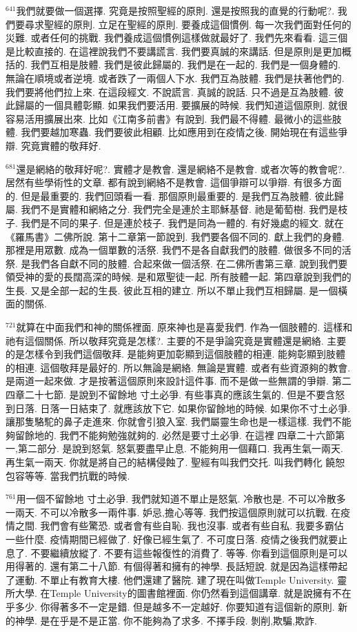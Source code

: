 \documentclass{book}
\begin{document}
$^{641}$我們就要做一個選擇.
究竟是按照聖經的原則.
還是按照我的直覺的行動呢?.
我們要尋求聖經的原則.
立足在聖經的原則.
要養成這個慣例.
每一次我們面對任何的災難.
或者任何的挑戰.
我們養成這個慣例這樣做就最好了.
我們先來看看.
這三個是比較直接的.
在這裡說我們不要講謊言.
我們要真誠的來講話.
但是原則是更加概括的.
我們互相是肢體.
我們是彼此歸屬的.
我們是在一起的.
我們是一個身體的.
無論在順境或者逆境.
或者跌了一兩個人下水.
我們互為肢體.
我們是扶著他們的.
我們要將他們拉上來.
在這段經文.
不說謊言.
真誠的說話.
只不過是互為肢體.
彼此歸屬的一個具體彰顯.
如果我們要活用.
要擴展的時候.
我們知道這個原則.
就很容易活用擴展出來.
比如《江南多前書》有說到.
我們最不得體.
最微小的這些肢體.
我們要越加寒蟲.
我們要彼此相顧.
比如應用到在疫情之後.
開始現在有這些爭辯.
究竟實體的敬拜好.

$^{681}$還是網絡的敬拜好呢?.
實體才是教會.
還是網絡不是教會.
或者次等的教會呢?.
居然有些學術性的文章.
都有說到網絡不是教會.
這個爭辯可以爭辯.
有很多方面的.
但是最重要的.
我們回頭看一看.
那個原則最重要的.
是我們互為肢體.
彼此歸屬.
我們不是實體和網絡之分.
我們完全是連於主耶穌基督.
祂是葡萄樹.
我們是枝子.
我們是不同的果子.
但是連於枝子.
我們是同為一體的.
有好幾處的經文.
就在《羅馬書》二佛所說.
第十二章第一節說到.
我們要各個不同的.
獻上我們的身體.
那裡是用眾數.
成為一個單數的活祭.
我們不是各自獻我們的肢體.
做很多不同的活祭.
是我們各自獻不同的肢體.
合起來做一個活祭.
在二佛所書第三章.
說到我們要領受神的愛的長闊高深的時候.
是和眾聖徒一起.
所有肢體一起.
第四章說到我們的生長.
又是全部一起的生長.
彼此互相的建立.
所以不單止我們互相歸屬.
是一個橫面的關係.

$^{721}$就算在中面我們和神的關係裡面.
原來神也是喜愛我們.
作為一個肢體的.
這樣和祂有這個關係.
所以敬拜究竟是怎樣?.
主要的不是爭論究竟是實體還是網絡.
主要的是怎樣令到我們這個敬拜.
是能夠更加彰顯到這個肢體的相連.
能夠彰顯到肢體的相連.
這個敬拜是最好的.
所以無論是網絡.
無論是實體.
或者有些資源夠的教會.
是兩道一起來做.
才是按著這個原則來設計這件事.
而不是做一些無謂的爭辯.
第二 四章二十七節.
是說到不留餘地 寸土必爭.
有些事真的應該生氣的.
但是不要含怒到日落.
日落一日結束了.
就應該放下它.
如果你留餘地的時候.
如果你不寸土必爭.
讓那隻駱駝的鼻子走進來.
你就會引狼入室.
我們屬靈生命也是一樣這樣.
我們不能夠留餘地的.
我們不能夠勉強就夠的.
必然是要寸土必爭.
在這裡 四章二十六節第一,第二部分.
是說到怒氣.
怒氣要盡早止息.
不能夠用一個藉口.
我再生氣一兩天.
再生氣一兩天.
你就是將自己的結構侵蝕了.
聖經有叫我們交托.
叫我們轉化 饒恕 包容等等.
當我們抗戰的時候.

$^{761}$用一個不留餘地 寸土必爭.
我們就知道不單止是怒氣.
冷散也是.
不可以冷散多一兩天.
不可以冷散多一兩件事.
妒忌,擔心等等.
我們按這個原則就可以抗戰.
在疫情之間.
我們會有些驚恐.
或者會有些自恥.
我也沒事.
或者有些自私.
我要多霸佔一些什麼.
疫情期間已經做了.
好像已經生氣了.
不可度日落.
疫情之後我們就要止息了.
不要繼續放縱了.
不要有這些報復性的消費了.
等等.
你看到這個原則是可以用得著的.
還有第二十八節.
有個得著和擁有的神學.
長話短說.
就是因為這樣帶起了運動.
不單止有教育大樓.
他們還建了醫院.
建了現在叫做Temple University.
靈所大學.
在Temple University的圖書館裡面.
你仍然看到這個講章.
就是說擁有不在乎多少.
你得著多不一定是錯.
但是越多不一定越好.
你要知道有這個新的原則.
新的神學.
是在乎是不是正當.
你不能夠為了求多.
不擇手段.
剝削,欺騙,欺詐.
\end{document}
